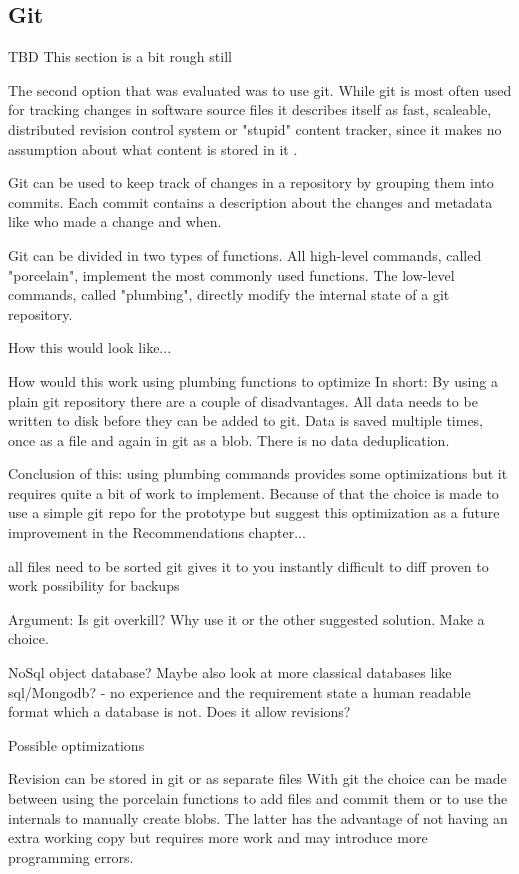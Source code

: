 \subsection{Git}
TBD This section is a bit rough still

The second option that was evaluated was to use git.
While git is most often used for tracking changes in software source files it describes itself as fast, scaleable, distributed revision control system or "stupid" content tracker, since it makes no assumption about what content is stored in it \cite{noauthor_git_2016}.

Git can be used to keep track of changes in a repository by grouping them into commits.
Each commit contains a description about the changes and metadata like who made a change and when.

Git can be divided in two types of functions.
All high-level commands, called "porcelain",  implement the most commonly used functions.
The low-level commands, called "plumbing", directly modify the internal state of a git repository.

How this would look like...

How would this work using plumbing functions to optimize \cite{noauthor_git_2016}
In short: By using a plain git repository there are a couple of disadvantages.
All data needs to be written to disk before they can be added to git.
Data is saved multiple times, once as a file and again in git as a blob.
There is no data deduplication.

Conclusion of this: using plumbing commands provides some optimizations but it requires quite a bit of work to implement.
Because of that the choice is made to use a simple git repo for the prototype but suggest this optimization as a future improvement in the Recommendations chapter...

all files need to be sorted
git gives it to you instantly
difficult to diff
proven to work
possibility for backups


Argument: Is git overkill? Why use it or the other suggested solution. Make a choice.


NoSql object database?
Maybe also look at more classical databases like sql/Mongodb? - no experience and the requirement state a human readable format which a database is not.
Does it allow revisions?

Possible optimizations

Revision can be stored in git or as separate files
With git the choice can be made between using the porcelain functions to add files and commit them or to use the internals to manually create blobs.
The latter has the advantage of not having an extra working copy but requires more work and may introduce more programming errors.

